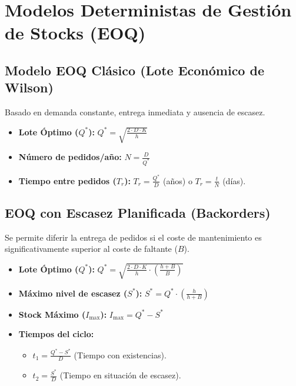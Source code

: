 \documentclass[11pt,a4paper]{article}
\begin{document}
\section{Modelos Deterministas de Gestión de Stocks (EOQ)}

\subsection{Modelo EOQ Clásico (Lote Económico de Wilson)}

Basado en demanda constante, entrega inmediata y ausencia de escasez.

\begin{itemize}
    \item \textbf{Lote Óptimo ($Q^{*}$):} $Q^{*} = \sqrt{\frac{2 \cdot D \cdot K}{h}}$
    \item \textbf{Número de pedidos/año:} $N = \frac{D}{Q^{*}}$
    \item \textbf{Tiempo entre pedidos ($T_r$):} $T_r = \frac{Q^{*}}{D}$ (años) o $T_r = \frac{t}{N}$ (días).

\end{itemize}
\subsection{EOQ con Escasez Planificada (Backorders)}

Se permite diferir la entrega de pedidos si el coste de mantenimiento es significativamente superior al coste de faltante ($B$).

\begin{itemize}
    \item \textbf{Lote Óptimo ($Q^{*}$):} $Q^{*} = \sqrt{\frac{2 \cdot D \cdot K}{h} \cdot \left( \frac{h+B}{B} \right)}$
    \item \textbf{Máximo nivel de escasez ($S^{*}$):} $S^{*} = Q^{*} \cdot \left( \frac{h}{h+B} \right)$
    \item \textbf{Stock Máximo ($I_{\max}$):} $I_{\max} = Q^{*} - S^{*}$
    \item \textbf{Tiempos del ciclo:}
          \begin{itemize}
              \item $t_1 = \frac{Q^{*} - S^{*}}{D}$ (Tiempo con existencias).
              \item $t_2 = \frac{S^{*}}{D}$ (Tiempo en situación de escasez).

          \end{itemize}
\end{itemize}
\end{document}
